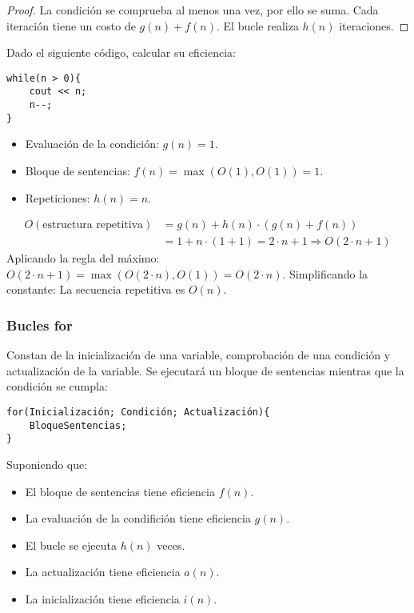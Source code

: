 \begin{proof}
La condición se comprueba al menos una vez, por ello se suma.  
Cada iteración tiene un costo de $g(n) + f(n)$.  
El bucle realiza $h(n)$ iteraciones.
\end{proof}

\begin{ejemplo}
Dado el siguiente código, calcular su eficiencia:
\begin{listing}[H]
\begin{verbatim}
while(n > 0){
    cout << n;
    n--;
}
\end{verbatim}
\end{listing}
\begin{itemize}
    \item Evaluación de la condición: $g(n) = 1$.  
    \item Bloque de sentencias: $f(n) = \max(O(1), O(1)) = 1$.  
    \item Repeticiones: $h(n) = n$.  
\end{itemize}
\begin{align*}
    O(\text{estructura repetitiva}) &= g(n) + h(n)\cdot (g(n)+f(n)) \\
                                    &= 1+n\cdot (1+1) = 2\cdot n+1 \Rightarrow O(2\cdot n+1)
\end{align*}
Aplicando la regla del máximo: $O(2\cdot n+1) = \max(O(2\cdot n), O(1)) = O(2\cdot n)$.  
Simplificando la constante: La secuencia repetitiva es $O(n)$.

\end{ejemplo}

\subsubsection{Bucles for}
Constan de la inicialización de una variable, comprobación de una condición y actualización de la variable. Se ejecutará un bloque de sentencias mientras que la condición se cumpla:
\begin{listing}[H]
\begin{verbatim}
for(Inicialización; Condición; Actualización){
    BloqueSentencias;
}
\end{verbatim}
\end{listing}

Suponiendo que:
\begin{itemize}
\item El bloque de sentencias tiene eficiencia $f(n)$.
\item La evaluación de la condifición tiene eficiencia $g(n)$.
\item El bucle se ejecuta $h(n)$ veces.
\item La actualización tiene eficiencia $a(n)$.
\item La inicialización tiene eficiencia $i(n)$.
\end{itemize}

